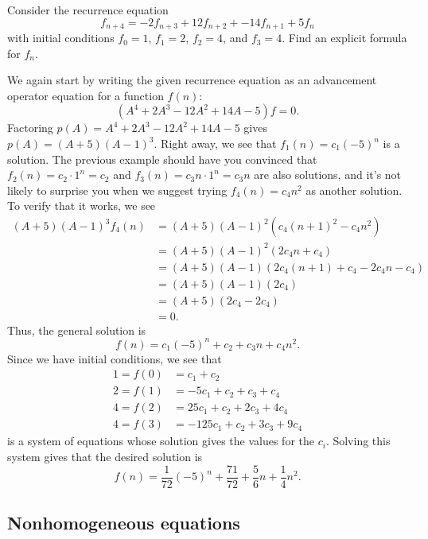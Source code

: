\begin{example}\label{ex:recurrence:deg4-repeated}
  Consider the recurrence equation
  \[f_{n+4} = -2f_{n+3} + 12f_{n+2} + -14 f_{n+1} + 5f_n\]
  with initial conditions $f_0 = 1$, $f_1= 2$, $f_2 = 4$, and $f_3 =
  4$. Find an explicit formula for $f_n$.

  We again start by writing the given recurrence equation as an
  advancement operator equation for a function $f(n)$:
  \begin{equation}
    \label{eqn:recurrence:deg4-repeated}
    (A^4 +2A^3 -12A^2+14A-5)f = 0.
  \end{equation}
  Factoring $p(A) = A^4 +2A^3 -12A^2+14A-5$ gives $p(A) =
  (A+5)(A-1)^3$. Right away, we see that $f_1(n) = c_1 (-5)^n$ is a
  solution. The previous example should have you convinced that
  $f_2(n) = c_2\cdot 1^n = c_2$ and $f_3(n) = c_3 n \cdot 1^n = c_3 n$
  are also solutions, and it's not likely to surprise you when we
  suggest trying $f_4(n) = c_4 n^2$ as another solution. To verify
  that it works, we see
  \begin{align*}
    (A+5)(A-1)^3 f_4(n) &= (A+5)(A-1)^2(c_4(n+1)^2 - c_4 n^2)\\
    & = (A+5)(A-1)^2 (2c_4 n + c_4)\\
    & = (A+5)(A-1)(2c_4(n+1) + c_4 - 2c_4 n -c_4)\\
    & = (A+5)(A-1)(2c_4)\\
    & = (A+5)(2c_4-2c_4)\\
    &= 0.
  \end{align*}
  Thus, the general solution is
  \[f(n) = c_1 (-5)^n + c_2 + c_3 n + c_4n^2.\]
  Since we have initial conditions, we see that
  \begin{align*}
    1= f(0) & = c_1+c_2\\
    2 = f(1) & = -5c_1 + c_2 + c_3 + c_4\\
    4 = f(2) & = 25c_1 + c_2 + 2c_3 + 4c_4\\
    4 = f(3) & = -125c_1 + c_2 +3c_3 +9c_4
  \end{align*}
  is a system of equations whose solution gives the values for the
  $c_i$. Solving this system gives that the desired solution is
  \[f(n) = \frac{1}{72} (-5)^n +\frac{71}{72} + \frac{5}{6} n +\frac{1}{4} n^2.\]
\end{example}

\subsection{Nonhomogeneous equations}\label{s:recurrence:solving:nonhomogeneous}

